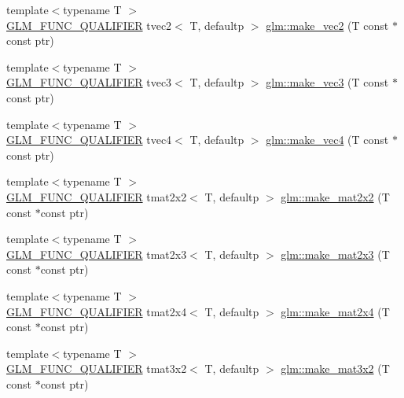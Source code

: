 \begin{DoxyCompactItemize}
{\footnotesize template$<$typename T $>$ }\\\mbox{\hyperlink{setup_8hpp_a33fdea6f91c5f834105f7415e2a64407}{G\+L\+M\+\_\+\+F\+U\+N\+C\+\_\+\+Q\+U\+A\+L\+I\+F\+I\+ER}} tvec2$<$ T, defaultp $>$ \mbox{\hyperlink{group__gtc__type__ptr_ga5f7393c30970c5949be13ceb525093a6}{glm\+::make\+\_\+vec2}} (T const $\ast$const ptr)
\item 
{\footnotesize template$<$typename T $>$ }\\\mbox{\hyperlink{setup_8hpp_a33fdea6f91c5f834105f7415e2a64407}{G\+L\+M\+\_\+\+F\+U\+N\+C\+\_\+\+Q\+U\+A\+L\+I\+F\+I\+ER}} tvec3$<$ T, defaultp $>$ \mbox{\hyperlink{group__gtc__type__ptr_ga86f4bc63570db86346db2e567fb760f6}{glm\+::make\+\_\+vec3}} (T const $\ast$const ptr)
\item 
{\footnotesize template$<$typename T $>$ }\\\mbox{\hyperlink{setup_8hpp_a33fdea6f91c5f834105f7415e2a64407}{G\+L\+M\+\_\+\+F\+U\+N\+C\+\_\+\+Q\+U\+A\+L\+I\+F\+I\+ER}} tvec4$<$ T, defaultp $>$ \mbox{\hyperlink{group__gtc__type__ptr_ga152345176b8951c15711f6ed4f6fc237}{glm\+::make\+\_\+vec4}} (T const $\ast$const ptr)
\item 
{\footnotesize template$<$typename T $>$ }\\\mbox{\hyperlink{setup_8hpp_a33fdea6f91c5f834105f7415e2a64407}{G\+L\+M\+\_\+\+F\+U\+N\+C\+\_\+\+Q\+U\+A\+L\+I\+F\+I\+ER}} tmat2x2$<$ T, defaultp $>$ \mbox{\hyperlink{group__gtc__type__ptr_gadb29e510762e1042069cb28bf24ae990}{glm\+::make\+\_\+mat2x2}} (T const $\ast$const ptr)
\item 
{\footnotesize template$<$typename T $>$ }\\\mbox{\hyperlink{setup_8hpp_a33fdea6f91c5f834105f7415e2a64407}{G\+L\+M\+\_\+\+F\+U\+N\+C\+\_\+\+Q\+U\+A\+L\+I\+F\+I\+ER}} tmat2x3$<$ T, defaultp $>$ \mbox{\hyperlink{group__gtc__type__ptr_ga37988c6dd941f617cdfab86d54375fc1}{glm\+::make\+\_\+mat2x3}} (T const $\ast$const ptr)
\item 
{\footnotesize template$<$typename T $>$ }\\\mbox{\hyperlink{setup_8hpp_a33fdea6f91c5f834105f7415e2a64407}{G\+L\+M\+\_\+\+F\+U\+N\+C\+\_\+\+Q\+U\+A\+L\+I\+F\+I\+ER}} tmat2x4$<$ T, defaultp $>$ \mbox{\hyperlink{group__gtc__type__ptr_ga6dfb2ac10859b0cc8e3893ea84fa95b5}{glm\+::make\+\_\+mat2x4}} (T const $\ast$const ptr)
\item 
{\footnotesize template$<$typename T $>$ }\\\mbox{\hyperlink{setup_8hpp_a33fdea6f91c5f834105f7415e2a64407}{G\+L\+M\+\_\+\+F\+U\+N\+C\+\_\+\+Q\+U\+A\+L\+I\+F\+I\+ER}} tmat3x2$<$ T, defaultp $>$ \mbox{\hyperlink{group__gtc__type__ptr_gabe1e5066608a66da7a94f802b57b4eed}{glm\+::make\+\_\+mat3x2}} (T const $\ast$const ptr)

\end{DoxyCompactItemize}
